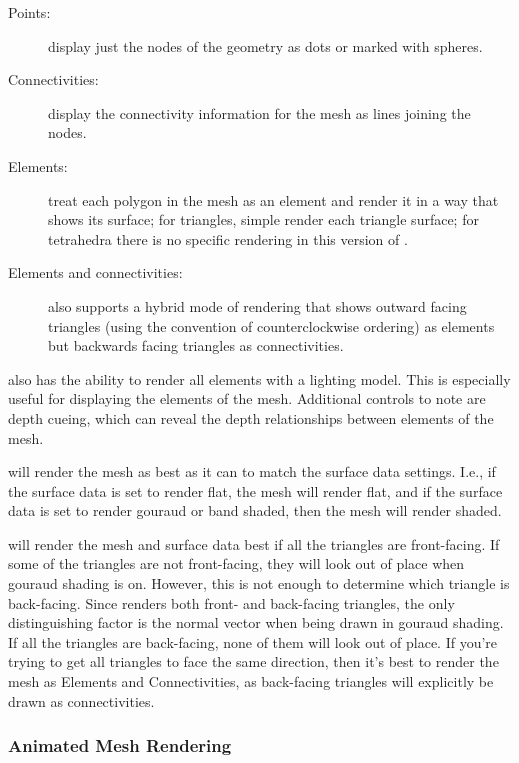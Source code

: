 \begin{description}
  \item [Points: ] display just the nodes of the geometry as dots or marked
        with spheres.
  \item [Connectivities: ] display the connectivity information for the
        mesh as lines joining the nodes.
  \item [Elements: ] treat each polygon in the mesh as an element and
        render it in a way that shows its surface; for triangles, simple
        render each triangle surface; for tetrahedra there is no specific
        rendering in this version of \map{}.
  \item [Elements and connectivities: ] \map{} also supports a hybrid mode
        of rendering that shows outward facing triangles (using the
        convention of counterclockwise ordering) as elements but backwards
        facing triangles as connectivities.
\end{description}

\map{} also has the ability to render
all elements with a lighting model.  This is especially useful for
displaying the elements of the mesh.  Additional controls to note are depth
cueing, which can reveal the depth relationships between elements of the
mesh. 

\map{} will render the mesh as best as it can to match the surface data
settings.  I.e., if the surface data is set to render flat, the mesh will
render flat, and if the surface data is set to render gouraud or band shaded, 
then the mesh will render shaded.

\map{} will render the mesh and surface data best if all the triangles are
front-facing.  If some of the triangles are not front-facing, they will look
out of place when gouraud shading is on.  However, this is not enough to 
determine which triangle is back-facing.  Since \map{} renders both front-
and back-facing triangles, the only distinguishing factor is the normal
vector when being drawn in gouraud shading.  If all the triangles are back-facing,
none of them will look out of place.  If you're trying to get all triangles to face
the same direction, then it's best to render the mesh as Elements and 
Connectivities, as back-facing triangles will explicitly be drawn as connectivities.

\subsubsection{Animated Mesh Rendering}
\label{sec:animated-mesh}

